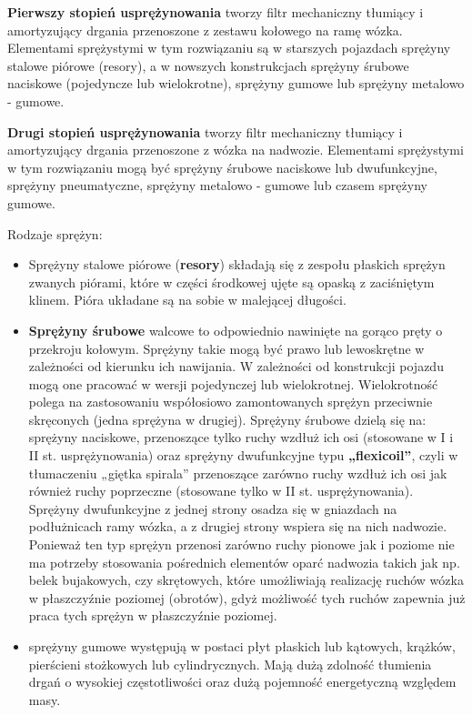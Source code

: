 \textbf{Pierwszy stopień usprężynowania} tworzy filtr mechaniczny tłumiący i amortyzujący drgania przenoszone z zestawu kołowego na ramę wózka. Elementami sprężystymi w tym rozwiązaniu są w starszych pojazdach sprężyny stalowe piórowe (resory), a w nowszych konstrukcjach sprężyny śrubowe naciskowe (pojedyncze lub wielokrotne), sprężyny gumowe lub sprężyny metalowo - gumowe. 

\textbf{Drugi stopień usprężynowania} tworzy filtr mechaniczny tłumiący i amortyzujący drgania przenoszone z wózka na nadwozie. Elementami sprężystymi w tym rozwiązaniu mogą być sprężyny śrubowe naciskowe lub dwufunkcyjne, sprężyny pneumatyczne, sprężyny metalowo - gumowe lub czasem sprężyny gumowe. 

Rodzaje sprężyn:
\begin{itemize}
	\item Sprężyny stalowe piórowe (\textbf{resory}) składają się z zespołu płaskich sprężyn zwanych piórami, które w części środkowej ujęte są opaską z zaciśniętym klinem. Pióra układane są na sobie w malejącej długości.
	\item \textbf{Sprężyny śrubowe} walcowe to odpowiednio nawinięte na gorąco pręty o przekroju kołowym. Sprężyny takie mogą być prawo lub lewoskrętne w zależności od kierunku ich nawijania. 
	W zależności od konstrukcji pojazdu mogą one pracować w wersji pojedynczej lub wielokrotnej. Wielokrotność polega na zastosowaniu współosiowo zamontowanych sprężyn przeciwnie skręconych (jedna sprężyna w drugiej). 
	Sprężyny śrubowe dzielą się na: sprężyny naciskowe, przenoszące tylko ruchy wzdłuż ich osi (stosowane w I i II st. usprężynowania) oraz sprężyny dwufunkcyjne typu \textbf{„flexicoil”}, czyli w tłumaczeniu „giętka spirala” przenoszące zarówno ruchy wzdłuż ich osi jak również ruchy poprzeczne (stosowane tylko w II st. usprężynowania). 
	Sprężyny dwufunkcyjne z jednej strony osadza się w gniazdach na podłużnicach ramy wózka, a z drugiej strony wspiera się na nich nadwozie. Ponieważ ten typ sprężyn przenosi zarówno ruchy pionowe jak i poziome nie ma potrzeby stosowania pośrednich elementów oparć nadwozia takich jak np. belek bujakowych, czy skrętowych, które umożliwiają realizację ruchów wózka w płaszczyźnie poziomej (obrotów), gdyż możliwość tych ruchów zapewnia już praca tych sprężyn w płaszczyźnie poziomej.
	\item sprężyny gumowe występują w postaci płyt płaskich lub kątowych, krążków, pierścieni stożkowych lub cylindrycznych. Mają dużą zdolność tłumienia drgań o wysokiej częstotliwości oraz dużą pojemność energetyczną względem masy.

\end{itemize}
